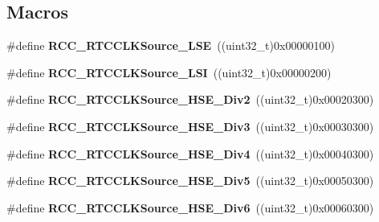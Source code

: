 \subsection*{Macros}
\begin{DoxyCompactItemize}
\item 
\mbox{\label{group___r_c_c___r_t_c___clock___source_ga18c0c40ff4289148c9fa44c6848d5552}} 
\#define {\bfseries R\+C\+C\+\_\+\+R\+T\+C\+C\+L\+K\+Source\+\_\+\+L\+SE}~((uint32\+\_\+t)0x00000100)
\item 
\mbox{\label{group___r_c_c___r_t_c___clock___source_ga7758c87e4584bfa76cb99c726b7162c3}} 
\#define {\bfseries R\+C\+C\+\_\+\+R\+T\+C\+C\+L\+K\+Source\+\_\+\+L\+SI}~((uint32\+\_\+t)0x00000200)
\item 
\mbox{\label{group___r_c_c___r_t_c___clock___source_ga9e271e201dcf0d4a37227ab45e9f5f67}} 
\#define {\bfseries R\+C\+C\+\_\+\+R\+T\+C\+C\+L\+K\+Source\+\_\+\+H\+S\+E\+\_\+\+Div2}~((uint32\+\_\+t)0x00020300)
\item 
\mbox{\label{group___r_c_c___r_t_c___clock___source_ga261ab891cd98902ce0f8916c4cca0aae}} 
\#define {\bfseries R\+C\+C\+\_\+\+R\+T\+C\+C\+L\+K\+Source\+\_\+\+H\+S\+E\+\_\+\+Div3}~((uint32\+\_\+t)0x00030300)
\item 
\mbox{\label{group___r_c_c___r_t_c___clock___source_ga713d67dd7fb37a6479fdc4098a97aa6d}} 
\#define {\bfseries R\+C\+C\+\_\+\+R\+T\+C\+C\+L\+K\+Source\+\_\+\+H\+S\+E\+\_\+\+Div4}~((uint32\+\_\+t)0x00040300)
\item 
\mbox{\label{group___r_c_c___r_t_c___clock___source_ga0885018abb63ca2a7ef4bb5639c428bd}} 
\#define {\bfseries R\+C\+C\+\_\+\+R\+T\+C\+C\+L\+K\+Source\+\_\+\+H\+S\+E\+\_\+\+Div5}~((uint32\+\_\+t)0x00050300)
\item 
\mbox{\label{group___r_c_c___r_t_c___clock___source_gac459b84faa16d0257ed01ff05dfca192}} 
\#define {\bfseries R\+C\+C\+\_\+\+R\+T\+C\+C\+L\+K\+Source\+\_\+\+H\+S\+E\+\_\+\+Div6}~((uint32\+\_\+t)0x00060300)

\end{DoxyCompactItemize}
